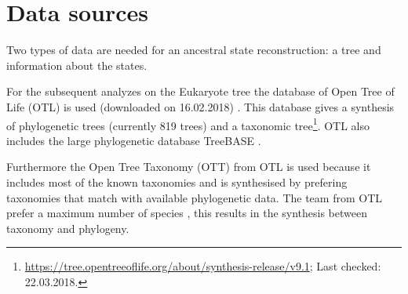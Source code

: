   \section{Data sources} \label{sec:methods - data sources}
    Two types of data are needed for an ancestral state reconstruction: a tree and information about 
      the states.

    For the subsequent analyzes on the Eukaryote tree the database of Open Tree of Life (OTL) is used 
      (downloaded on 16.02.2018) \cite{Hinchliff2015}. This database gives a synthesis of phylogenetic 
      trees (currently 819 trees) and a taxonomic tree\footnote{
        \hyperlink{https://tree.opentreeoflife.org/about/synthesis-release/v9.1}
        {https://tree.opentreeoflife.org/about/synthesis-release/v9.1}; Last checked: 22.03.2018.
      }. OTL also  includes the large phylogenetic database TreeBASE \cite{Hinchliff2015}.
      
    Furthermore the Open Tree Taxonomy (OTT) from OTL is used because it includes most of the known 
      taxonomies and is synthesised by prefering taxonomies that match with available phylogenetic 
      data. The team from OTL prefer a maximum number of species \cite{Hinchliff2015}, this results 
      in the synthesis between taxonomy and phylogeny.

